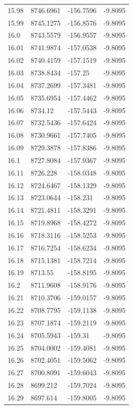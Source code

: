 \begin{table}[H]
\begin{tabular}{llll}
15.98 & 8746.6961 & -156.7596 & -9.8095 \\
15.99 & 8745.1275 & -156.8576 & -9.8095 \\
16.0 & 8743.5579 & -156.9557 & -9.8095 \\
16.01 & 8741.9874 & -157.0538 & -9.8095 \\
16.02 & 8740.4159 & -157.1519 & -9.8095 \\
16.03 & 8738.8434 & -157.25 & -9.8095 \\
16.04 & 8737.2699 & -157.3481 & -9.8095 \\
16.05 & 8735.6954 & -157.4462 & -9.8095 \\
16.06 & 8734.12 & -157.5443 & -9.8095 \\
16.07 & 8732.5436 & -157.6424 & -9.8095 \\
16.08 & 8730.9661 & -157.7405 & -9.8095 \\
16.09 & 8729.3878 & -157.8386 & -9.8095 \\
16.1 & 8727.8084 & -157.9367 & -9.8095 \\
16.11 & 8726.228 & -158.0348 & -9.8095 \\
16.12 & 8724.6467 & -158.1329 & -9.8095 \\
16.13 & 8723.0644 & -158.231 & -9.8095 \\
16.14 & 8721.4811 & -158.3291 & -9.8095 \\
16.15 & 8719.8968 & -158.4272 & -9.8095 \\
16.16 & 8718.3116 & -158.5253 & -9.8095 \\
16.17 & 8716.7254 & -158.6234 & -9.8095 \\
16.18 & 8715.1381 & -158.7214 & -9.8095 \\
16.19 & 8713.55 & -158.8195 & -9.8095 \\
16.2 & 8711.9608 & -158.9176 & -9.8095 \\
16.21 & 8710.3706 & -159.0157 & -9.8095 \\
16.22 & 8708.7795 & -159.1138 & -9.8095 \\
16.23 & 8707.1874 & -159.2119 & -9.8095 \\
16.24 & 8705.5943 & -159.31 & -9.8095 \\
16.25 & 8704.0002 & -159.4081 & -9.8095 \\
16.26 & 8702.4051 & -159.5062 & -9.8095 \\
16.27 & 8700.8091 & -159.6043 & -9.8095 \\
16.28 & 8699.212 & -159.7024 & -9.8095 \\
16.29 & 8697.614 & -159.8005 & -9.8095 \\

\end{tabular}
\end{table}
